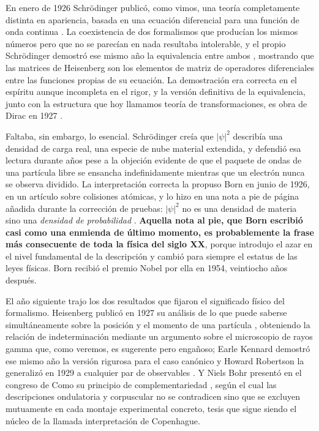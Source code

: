     En enero de 1926 Schrödinger publicó, como vimos, una teoría completamente distinta en apariencia, basada en una ecuación diferencial para una función de onda continua \citep{schrodinger1926quantisierung}. La coexistencia de dos formalismos que producían los mismos números pero que no se parecían en nada resultaba intolerable, y el propio Schrödinger demostró ese mismo año la equivalencia entre ambos \citep{schrodinger1926verhaltnis}, mostrando que las matrices de Heisenberg son los elementos de matriz de operadores diferenciales entre las funciones propias de su ecuación. La demostración era correcta en el espíritu aunque incompleta en el rigor, y la versión definitiva de la equivalencia, junto con la estructura que hoy llamamos teoría de transformaciones, es obra de Dirac en 1927 \citep{dirac1927physical}.

    Faltaba, sin embargo, lo esencial. Schrödinger creía que $|\psi|^{2}$ describía una densidad de carga real, una especie de nube material extendida, y defendió esa lectura durante años pese a la objeción evidente de que el paquete de ondas de una partícula libre se ensancha indefinidamente mientras que un electrón nunca se observa dividido. La interpretación correcta la propuso Born en junio de 1926, en un artículo sobre colisiones atómicas, y lo hizo en una nota a pie de página añadida durante la corrección de pruebas: $|\psi|^{2}$ no es una densidad de materia sino una \textit{densidad de probabilidad} \citep{born1926stossvorgange}. \textbf{Aquella nota al pie, que Born escribió casi como una enmienda de último momento, es probablemente la frase más consecuente de toda la física del siglo XX}, porque introdujo el azar en el nivel fundamental de la descripción y cambió para siempre el estatus de las leyes físicas. Born recibió el premio Nobel por ella en 1954, veintiocho años después.

    El año siguiente trajo los dos resultados que fijaron el significado físico del formalismo. Heisenberg publicó en 1927 su análisis de lo que puede saberse simultáneamente sobre la posición y el momento de una partícula \citep{heisenberg1927anschaulichen}, obteniendo la relación de indeterminación mediante un argumento sobre el microscopio de rayos gamma que, como veremos, es sugerente pero engañoso; Earle Kennard demostró ese mismo año la versión rigurosa para el caso canónico \citep{kennard1927quantenmechanik} y Howard Robertson la generalizó en 1929 a cualquier par de observables \citep{robertson1929uncertainty}. Y Niels Bohr presentó en el congreso de Como su principio de complementariedad \citep{bohr1928quantum}, según el cual las descripciones ondulatoria y corpuscular no se contradicen sino que se excluyen mutuamente en cada montaje experimental concreto, tesis que sigue siendo el núcleo de la llamada interpretación de Copenhague.

